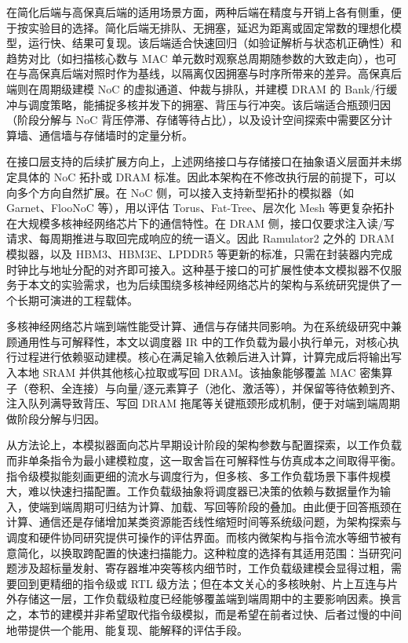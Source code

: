 在简化后端与高保真后端的适用场景方面，两种后端在精度与开销上各有侧重，便于按实验目的选择。简化后端无排队、无拥塞，延迟为距离或固定常数的理想化模型，运行快、结果可复现。该后端适合快速回归（如验证解析与状态机正确性）和趋势对比（如扫描核心数与 MAC 单元数时观察总周期随参数的大致走向），也可在与高保真后端对照时作为基线，以隔离仅因拥塞与时序所带来的差异。高保真后端则在周期级建模 NoC 的虚拟通道、仲裁与排队，并建模 DRAM 的 Bank/行缓冲与调度策略，能捕捉多核并发下的拥塞、背压与行冲突。该后端适合瓶颈归因（阶段分解与 NoC 背压停滞、存储等待占比），以及设计空间探索中需要区分计算墙、通信墙与存储墙时的定量分析。

在接口层支持的后续扩展方向上，上述网络接口与存储接口在抽象语义层面并未绑定具体的 NoC 拓扑或 DRAM 标准。因此本架构在不修改执行层的前提下，可以向多个方向自然扩展。在 NoC 侧，可以接入支持新型拓扑的模拟器（如 Garnet、FlooNoC 等），用以评估 Torus、Fat-Tree、层次化 Mesh 等更复杂拓扑在大规模多核神经网络芯片下的通信特性。在 DRAM 侧，接口仅要求注入读/写请求、每周期推进与取回完成响应的统一语义。因此 Ramulator2 之外的 DRAM 模拟器，以及 HBM3、HBM3E、LPDDR5 等更新的标准，只需在封装器内完成时钟比与地址分配的对齐即可接入。这种基于接口的可扩展性使本文模拟器不仅服务于本文的实验需求，也为后续围绕多核神经网络芯片的架构与系统研究提供了一个长期可演进的工程载体。



\label{sec:c3_core}


多核神经网络芯片端到端性能受计算、通信与存储共同影响。为在系统级研究中兼顾通用性与可解释性，本文以调度器 IR 中的工作负载为最小执行单元，对核心执行过程进行依赖驱动建模。核心在满足输入依赖后进入计算，计算完成后将输出写入本地 SRAM 并供其他核心拉取或写回 DRAM。该抽象能够覆盖 MAC 密集算子（卷积、全连接）与向量/逐元素算子（池化、激活等），并保留等待依赖到齐、注入队列满导致背压、写回 DRAM 拖尾等关键瓶颈形成机制，便于对端到端周期做阶段分解与归因。

从方法论上，本模拟器面向芯片早期设计阶段的架构参数与配置探索，以工作负载而非单条指令为最小建模粒度，这一取舍旨在可解释性与仿真成本之间取得平衡。指令级模拟能刻画更细的流水与调度行为，但多核、多工作负载场景下事件规模大，难以快速扫描配置。工作负载级抽象将调度器已决策的依赖与数据量作为输入，使端到端周期可归结为计算、加载、写回等阶段的叠加。由此便于回答瓶颈在计算、通信还是存储增加某类资源能否线性缩短时间等系统级问题，为架构探索与调度和硬件协同研究提供可操作的评估界面。而核内微架构与指令流水等细节被有意简化，以换取跨配置的快速扫描能力。这种粒度的选择有其适用范围：当研究问题涉及超标量发射、寄存器堆冲突等核内细节时，工作负载级建模会显得过粗，需要回到更精细的指令级或 RTL 级方法；但在本文关心的多核映射、片上互连与片外存储这一层，工作负载级粒度已经能够覆盖端到端周期中的主要影响因素。换言之，本节的建模并非希望取代指令级模拟，而是希望在前者过快、后者过慢的中间地带提供一个能用、能复现、能解释的评估手段。

